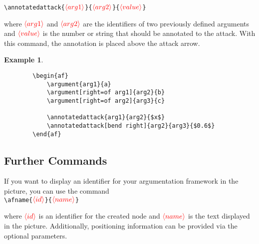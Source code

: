 \documentclass{article}
\newcommand{\opt}[2][red]{\ensuremath{\textcolor{#1}{\langle #2\rangle}}}
\newtheorem{example}{Example}
\begin{document}
    \noindent
    \verb|\annotatedattack{|\opt{arg1}\verb|}{|\opt{arg2}\verb|}{|\opt{value}\verb|}|
    
    \begin{list}{}{\leftmargin=\parindent\rightmargin=0pt}
        \item where \opt{arg1} and \opt{arg2} are the identifiers of two previously defined arguments and \opt{value} is the number or string that should be annotated to the attack.
        With this command, the annotation is placed above the attack arrow.
    \end{list}

    \begin{example}~
    \begin{verbatim}
        \begin{af}
            \argument{arg1}{a}
            \argument[right=of arg1]{arg2}{b}
            \argument[right=of arg2]{arg3}{c}
    
            \annotatedattack{arg1}{arg2}{$x$}
            \annotatedattack[bend right]{arg2}{arg3}{$0.6$}
        \end{af}    
    \end{verbatim}

    \begin{center}
        \begin{af}
    
        \end{af}    
    \end{center}
    \end{example}

\subsection{Further Commands}
    If you want to display an identifier for your argumentation framework in the picture, you can use the command\\

    \noindent
    \verb|\afname{|\opt{id}\verb|}{|\opt{name}\verb|}|

    \begin{list}{}{\leftmargin=\parindent\rightmargin=0pt}
    \item where \opt{id} is an identifier for the created node and \opt{name} is the text displayed in the picture.
    Additionally, positioning information can be provided via the optional parameters.
    \end{list}
\end{document}

